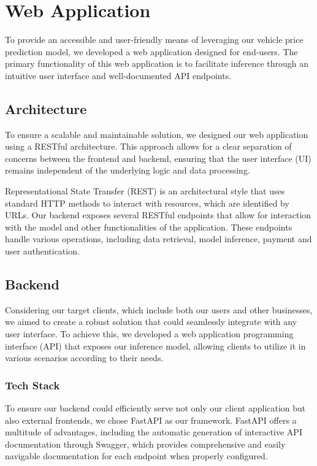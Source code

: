 \chapter{Web Application}
To provide an accessible and user-friendly means of leveraging our vehicle price prediction model, we developed a web application designed for end-users. The primary functionality of this web application is to facilitate inference through an intuitive user interface and well-documented API endpoints.

\section{Architecture}
To ensure a scalable and maintainable solution, we designed our web application using a RESTful architecture. This approach allows for a clear separation of concerns between the frontend and backend, ensuring that the user interface (UI) remains independent of the underlying logic and data processing.

Representational State Transfer (REST) is an architectural style that uses standard HTTP methods to interact with resources, which are identified by URLs. Our backend exposes several RESTful endpoints that allow for interaction with the model and other functionalities of the application. These endpoints handle various operations, including data retrieval, model inference, payment and user authentication.

\section{Backend}
Considering our target clients, which include both our users and other businesses, we aimed to create a robust solution that could seamlessly integrate with any user interface. To achieve this, we developed a web application programming interface (API) that exposes our inference model, allowing clients to utilize it in various scenarios according to their needs.

\subsection{Tech Stack}
To ensure our backend could efficiently serve not only our client application but also external frontends, we chose FastAPI \cite{fastapi} as our framework. FastAPI offers a multitude of advantages, including the automatic generation of interactive API documentation through Swagger, which provides comprehensive and easily navigable documentation for each endpoint when properly configured.

